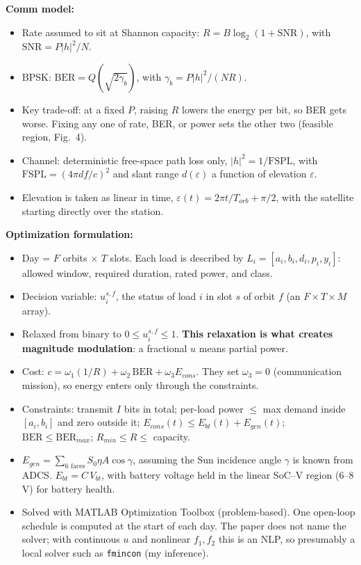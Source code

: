 \documentclass[11pt]{article}
\begin{document}
\textbf{Comm model:}
\begin{itemize}[noitemsep]
    \item Rate assumed to sit at Shannon capacity: $R = B\log_2(1+\mathrm{SNR})$, with $\mathrm{SNR} = P|h|^2/N$.
    \item BPSK: $\mathrm{BER} = Q(\sqrt{2\gamma_b})$, with $\gamma_b = P|h|^2/(NR)$.
    \item Key trade-off: at a fixed $P$, raising $R$ lowers the energy per bit, so BER gets worse. Fixing any one of rate, BER, or power sets the other two (feasible region, Fig.\ 4).
    \item Channel: deterministic free-space path loss only, $|h|^2 = 1/\mathrm{FSPL}$, with $\mathrm{FSPL} = (4\pi d f/c)^2$ and slant range $d(\varepsilon)$ a function of elevation $\varepsilon$.
    \item Elevation is taken as linear in time, $\varepsilon(t) = 2\pi t/T_{orb} + \pi/2$, with the satellite starting directly over the station.
\end{itemize}

\textbf{Optimization formulation:}
\begin{itemize}[noitemsep]
    \item Day = $F$ orbits $\times$ $T$ slots. Each load is described by $L_i = [a_i, b_i, d_i, p_i, y_i]$: allowed window, required duration, rated power, and class.
    \item Decision variable: $u_i^{s,f}$, the status of load $i$ in slot $s$ of orbit $f$ (an $F\times T\times M$ array).
    \item Relaxed from binary to $0 \le u_i^{s,f} \le 1$. \textbf{This relaxation is what creates magnitude modulation}: a fractional $u$ means partial power.
    \item Cost: $c = \omega_1 (1/R) + \omega_2\,\mathrm{BER} + \omega_3 E_{cons}$. They set $\omega_3 = 0$ (communication mission), so energy enters only through the constraints.
    \item Constraints: transmit $I$ bits in total; per-load power $\le$ max demand inside $[a_i,b_i]$ and zero outside it; $E_{cons}(t) \le E_{bt}(t) + E_{gen}(t)$; $\mathrm{BER} \le \mathrm{BER}_{max}$; $R_{min} \le R \le$ capacity.
    \item $E_{gen} = \sum_{\text{6 faces}} S_0 \eta A \cos\gamma$, assuming the Sun incidence angle $\gamma$ is known from ADCS. $E_{bt} = C\,V_{bt}$, with battery voltage held in the linear SoC--V region (6--8 V) for battery health.
    \item Solved with MATLAB Optimization Toolbox (problem-based). One open-loop schedule is computed at the start of each day. The paper does not name the solver; with continuous $u$ and nonlinear $f_1, f_2$ this is an NLP, so presumably a local solver such as \texttt{fmincon} (my inference).
\end{itemize}
\end{document}
